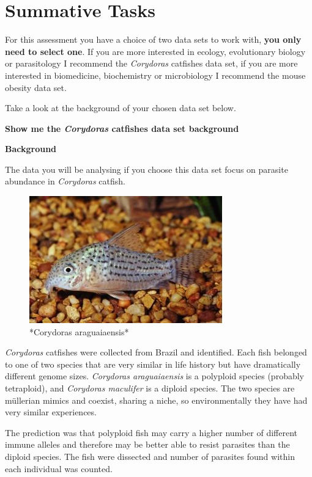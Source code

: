 \documentclass[
]{book}
\begin{document}
\chapter{Summative Tasks}\label{summative-tasks}

For this assessment you have a choice of two data sets to work with, \textbf{you only need to select one}. If you are more interested in ecology, evolutionary biology or parasitology I recommend the \emph{Corydoras} catfishes data set, if you are more interested in biomedicine, biochemistry or microbiology I recommend the mouse obesity data set.

Take a look at the background of your chosen data set below.

\textbf{Show me the \emph{Corydoras} catfishes data set background}

\textbf{Background}

The data you will be analysing if you choose this data set focus on parasite abundance in \emph{Corydoras} catfish.

\begin{figure}
\includegraphics[width=0.9\linewidth]{figures/cory} \caption{*Corydoras araguaiaensis*}\label{fig:unnamed-chunk-80}
\end{figure}

\emph{Corydoras} catfishes were collected from Brazil and identified. Each fish belonged to one of two species that are very similar in life history but have dramatically different genome sizes. \emph{Corydoras araguaiaensis} is a polyploid species (probably tetraploid), and \emph{Corydoras maculifer} is a diploid species. The two species are müllerian mimics and coexist, sharing a niche, so environmentally they have had very similar experiences.

The prediction was that polyploid fish may carry a higher number of different immune alleles and therefore may be better able to resist parasites than the diploid species. The fish were dissected and number of parasites found within each individual was counted.
\end{document}

